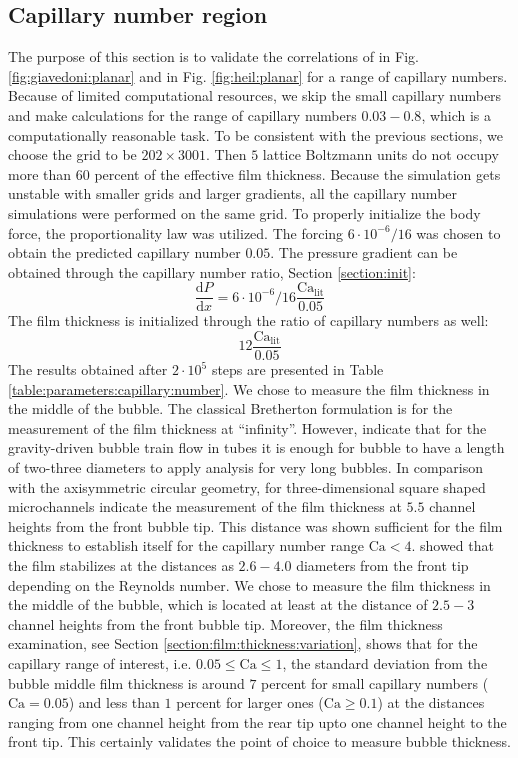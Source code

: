 \documentclass[preprint,12pt]{elsarticle}
\newcommand{\Ca}{\mathrm{Ca}}
\begin{document}
\subsection{Capillary number region}
\label{section:capillary:range}
The purpose of this section is to validate the correlations of
\citet{giavedoni-numerical} in Fig. \ref{fig:giavedoni:planar} and
\citet{heil-bretherton} in Fig. \ref{fig:heil:planar} for a range of capillary
numbers. Because of limited computational resources, we skip the
small capillary numbers and make calculations for the range of capillary numbers $0.03-0.8$, which
is a computationally reasonable task.  To be consistent with the previous sections, we choose the grid to be
$202 \times 3001$. Then $5$ lattice Boltzmann units do not occupy more than $60$
percent of the effective film thickness. Because the simulation gets unstable with
smaller grids and larger gradients, all the capillary number simulations were
performed on the same grid. To properly initialize the body force, the
proportionality law was utilized. The forcing
$6 \cdot 10^{-6}/16$ was chosen to obtain the predicted capillary
number $0.05$.  
The pressure gradient can be obtained through the capillary number
ratio, Section \ref{section:init}:
\begin{equation}
\frac{\mathrm{d}P}{\mathrm{d} x}=6 \cdot 10^{-6}/16 \frac{\Ca_{\mathrm{lit}}}{0.05}
\end{equation}
The film thickness is initialized through the ratio of capillary numbers as well:
\begin{equation*}
12 \frac{\Ca_{\mathrm{lit}}}{0.05}
\end{equation*}
The results obtained after $2\cdot10^5$ steps are presented in Table
\ref{table:parameters:capillary:number}. 
{\color{red} We chose to measure the film thickness in the middle of the bubble. The
classical Bretherton formulation is for the measurement of the film thickness at ``infinity''.
However, \citet{cerro-bubble-train} indicate that for the gravity-driven bubble train flow in tubes
it is enough for bubble to have a length of two-three diameters to apply analysis for very long
bubbles. In comparison with the axisymmetric circular geometry, for three-dimensional square shaped
microchannels \citet{heil-threedim} indicate the measurement of the film thickness at $5.5$
channel heights from the front bubble tip. This distance was shown sufficient for the
film thickness to establish itself for the capillary number range $\Ca<4$.
\citet{giavedoni-numerical} showed that the film stabilizes at the distances as $2.6-4.0$ diameters
from the front tip depending on the Reynolds number.  We chose to measure the film thickness in the
middle of the bubble, which is located at least at the distance of $2.5-3$ channel heights from the
front bubble tip. Moreover, the film thickness examination, see Section
\ref{section:film:thickness:variation}, shows that for the capillary range of interest, i.e.
$0.05\leq \Ca \leq 1$, the standard deviation from the bubble middle film thickness is around $7$
percent for small capillary numbers ($\Ca=0.05$) and less than $1$ percent for larger ones ($\Ca
\geq 0.1$) at the distances ranging from one channel height from the rear tip upto one channel
height to the front tip. This certainly validates the point of choice to measure bubble thickness.}
\end{document}
